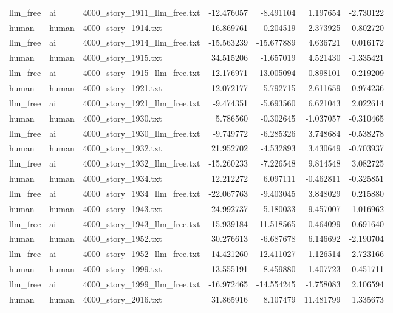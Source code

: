 \begin{longtable}{lllrrrr}
llm\_free & ai & 4000\_story\_1911\_llm\_free.txt & -12.476057 & -8.491104 & 1.197654 & -2.730122 \\
human & human & 4000\_story\_1914.txt & 16.869761 & 0.204519 & 2.373925 & 0.802720 \\
llm\_free & ai & 4000\_story\_1914\_llm\_free.txt & -15.563239 & -15.677889 & 4.636721 & 0.016172 \\
human & human & 4000\_story\_1915.txt & 34.515206 & -1.657019 & 4.521430 & -1.335421 \\
llm\_free & ai & 4000\_story\_1915\_llm\_free.txt & -12.176971 & -13.005094 & -0.898101 & 0.219209 \\
human & human & 4000\_story\_1921.txt & 12.072177 & -5.792715 & -2.611659 & -0.974236 \\
llm\_free & ai & 4000\_story\_1921\_llm\_free.txt & -9.474351 & -5.693560 & 6.621043 & 2.022614 \\
human & human & 4000\_story\_1930.txt & 5.786560 & -0.302645 & -1.037057 & -0.310465 \\
llm\_free & ai & 4000\_story\_1930\_llm\_free.txt & -9.749772 & -6.285326 & 3.748684 & -0.538278 \\
human & human & 4000\_story\_1932.txt & 21.952702 & -4.532893 & 3.430649 & -0.703937 \\
llm\_free & ai & 4000\_story\_1932\_llm\_free.txt & -15.260233 & -7.226548 & 9.814548 & 3.082725 \\
human & human & 4000\_story\_1934.txt & 12.212272 & 6.097111 & -0.462811 & -0.325851 \\
llm\_free & ai & 4000\_story\_1934\_llm\_free.txt & -22.067763 & -9.403045 & 3.848029 & 0.215880 \\
human & human & 4000\_story\_1943.txt & 24.992737 & -5.180033 & 9.457007 & -1.016962 \\
llm\_free & ai & 4000\_story\_1943\_llm\_free.txt & -15.939184 & -11.518565 & 0.464099 & -0.691640 \\
human & human & 4000\_story\_1952.txt & 30.276613 & -6.687678 & 6.146692 & -2.190704 \\
llm\_free & ai & 4000\_story\_1952\_llm\_free.txt & -14.421260 & -12.411027 & 1.126514 & -2.723166 \\
human & human & 4000\_story\_1999.txt & 13.555191 & 8.459880 & 1.407723 & -0.451711 \\
llm\_free & ai & 4000\_story\_1999\_llm\_free.txt & -16.972465 & -14.554245 & -1.758083 & 2.106594 \\
human & human & 4000\_story\_2016.txt & 31.865916 & 8.107479 & 11.481799 & 1.335673 \\

\end{longtable}
